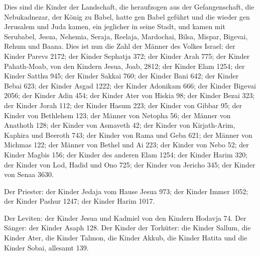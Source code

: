  Dies sind die Kinder der Landschaft, die heraufzogen aus
der Gefangenschaft, die Nebukadnezar, der König zu Babel, hatte gen
Babel geführt und die wieder gen Jerusalem und Juda kamen, ein jeglicher
in seine Stadt,  und kamen mit Serubabel, Jesua, Nehemia,
Seraja, Reelaja, Mardochai, Bilsa, Mispar, Bigevai, Rehum und Baana.
Dies ist nun die Zahl der Männer des Volkes Israel:  der
Kinder Parevs 2172;  der Kinder Sephatja 372;
 der Kinder Arah 775;  der Kinder
Pahath-Moab, von den Kindern Jesua, Joab, 2812;  der
Kinder Elam 1254;  der Kinder Satthu 945; 
der Kinder Sakkai 760;  der Kinder Bani 642;
 der Kinder Bebai 623;  der Kinder Asgad
1222;  der Kinder Adonikam 666;  der
Kinder Bigevai 2056;  der Kinder Adin 454;
 der Kinder Ater von Hiskia 98;  der
Kinder Bezai 323;  der Kinder Jorah 112; 
der Kinder Hasum 223;  der Kinder von Gibbar 95;
 der Kinder von Bethlehem 123;  der Männer
von Netopha 56;  der Männer von Anathoth 128;
 der Kinder von Asmaveth 42;  der Kinder
von Kirjath-Arim, Kaphira und Beeroth 743;  der Kinder
von Rama und Geba 621;  der Männer von Michmas 122;
 der Männer von Bethel und Ai 223;  der
Kinder von Nebo 52;  der Kinder Magbis 156;
 der Kinder des anderen Elam 1254;  der
Kinder Harim 320;  der Kinder von Lod, Hadid und Ono 725;
 der Kinder von Jericho 345;  der Kinder
von Senaa 3630.

 Der Priester: der Kinder Jedaja vom Hause Jesua 973;
 der Kinder Immer 1052;  der Kinder Pashur
1247;  der Kinder Harim 1017.

 Der Leviten: der Kinder Jesua und Kadmiel von den
Kindern Hodavja 74.  Der Sänger: der Kinder Asaph 128.
 Der Kinder der Torhüter: die Kinder Sallum, die Kinder
Ater, die Kinder Talmon, die Kinder Akkub, die Kinder Hatita und die
Kinder Sobai, allesamt 139.


